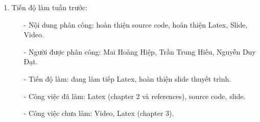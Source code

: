 \begin{enumerate}
\begin{enumerate}
\begin{enumerate}
\begin{itemize}
                    \end{itemize}
                \end{enumerate}
            \item Tiến độ làm tuần trước:
                \begin{enumerate}
                    \item[-] Nội dung phân công: hoàn thiện source code, hoàn thiện Latex, Slide, Video.
                    \item[-] Người được phân công: Mai Hoàng Hiệp, Trần Trung Hiếu, Nguyễn Duy Đạt.
                    \item[-] Tiến độ làm: đang làm tiếp Latex, hoàn thiện slide thuyết trình.
                    \item[-] Công việc đã làm: Latex (chapter 2 và references), source code, slide.
                    \item[-] Công việc chưa làm: Video, Latex (chapter 3).
                \end{enumerate}
        \end{enumerate}
\end{enumerate}
